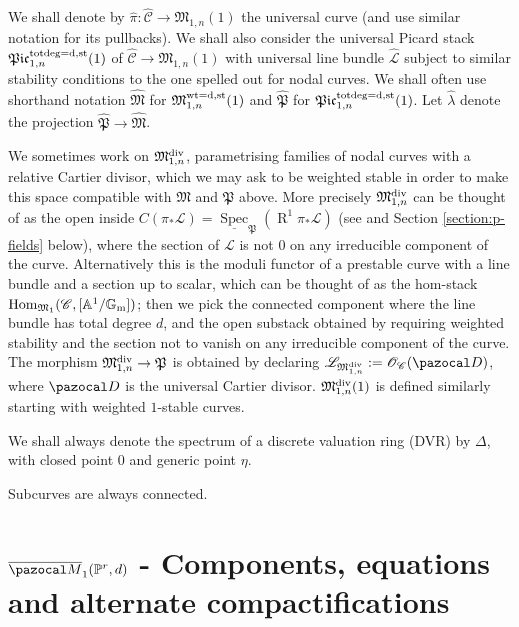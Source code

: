 \documentclass[11pt]{amsart}
\newcommand{\PP}{\mathbb P}
\newcommand{\OO}{\mathcal O}
\renewcommand{\to}{\rightarrow}
\newcommand{\Aaff}{\mathbb A}
\newcommand{\cC}{\mathcal C}
\newcommand{\MM}{\mathfrak M}
\newcommand{\pP}{\mathfrak P}
\newcommand{\oM}{\overline{\pazocal M}}
\newcommand{\R}{\operatorname{R}}
\newcommand{\Gm}{\mathbb{G}_{\rm{m}}}
\newcommand{\PtoM}{\lambda}
\newcommand{\dvr}{\Delta}
\newcommand{\Spec}{\underline{\operatorname{Spec}}}
\newcommand{\Hom}{\operatorname{Hom}}
\theoremstyle{plain}
\theoremstyle{definition}
\begin{document}
We shall denote by $\hat{\pi}\colon \widehat{\cC}\to \MM_{1,n}(1)$ the universal curve (and use similar notation for its pullbacks). We shall also consider the universal Picard stack $\mathfrak{Pic}^{\rm{tot deg}=d,\rm{st}}_{1,n}(1)$ of $\widehat{\cC}\to \mathfrak M_{1,n}(1)$ with universal line bundle $\widehat{\mathcal{L}}$ subject to similar stability conditions to the one spelled out for nodal curves. We shall often use shorthand notation $\widehat{\MM}$ for $\mathfrak M_{1,n}^{\rm{wt}=d,\rm{st}}(1)$ and $\widehat{\mathfrak P}$ for $\mathfrak{Pic}^{\rm{tot deg}=d,\rm{st}}_{1,n}(1)$. Let $\hat{\PtoM}$ denote the projection $\widehat{\mathfrak P}\to \widehat{\MM}$.

We sometimes work on $\MM_{1,n}^{\rm{div}}$, parametrising families of nodal curves with a relative Cartier divisor, which we may ask to be weighted stable in order to make this space compatible with $\MM$ and $\mathfrak P$ above. More precisely $\MM_{1,n}^{\rm{div}}$ can be thought of as the open inside $C(\pi_*\mathcal L)=\Spec_\pP(\R^1\pi_*\mathcal L)$ (see \cite{CLpfields} and Section \ref{section:p-fields} below), where the section of $\mathcal L$ is not $0$ on any irreducible component of the curve. Alternatively this is the moduli functor of a prestable curve with a line bundle and a section up to scalar, which can be thought of as the hom-stack $\Hom_{\MM_1}(\cC,[\Aaff^1/\Gm])$; then we pick the connected component where the line bundle has total degree $d$, and the open substack obtained by requiring weighted stability and the section not to vanish on any irreducible component of the curve. The morphism $\MM_{1,n}^{\rm{div}}\to\mathfrak P$ is obtained by declaring $\mathcal L_{\MM_{1,n}^{\rm{div}}}:=\OO_{\cC}(\pazocal D)$, where $\pazocal D$ is the universal Cartier divisor. $\MM_{1,n}^{\rm{div}}(1)$ is defined similarly starting with weighted $1$-stable curves.

We shall always denote the spectrum of a discrete valuation ring (DVR) by $\dvr$, with closed point $0$ and generic point $\eta$.

Subcurves are always connected.






\section{$\oM_1(\PP^r,d)$ - Components, equations  and alternate compactifications}\label{sec:section1}
\end{document}
